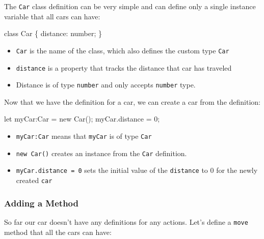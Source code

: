 \documentclass[12pt,]{article}
\newenvironment{Shaded}{}{}
\newcommand{\KeywordTok}[1]{\textcolor[rgb]{0.00,0.00,1.00}{{#1}}}
\newcommand{\DecValTok}[1]{{#1}}
\newcommand{\FunctionTok}[1]{{#1}}
\newcommand{\NormalTok}[1]{{#1}}
\providecommand{\tightlist}{%
  \setlength{\itemsep}{0pt}\setlength{\parskip}{0pt}}
\begin{document}
The \texttt{Car} class definition can be very simple and can define only
a single instance variable that all cars can have:

\begin{Shaded}
\begin{Highlighting}[numbers=left,,]
\KeywordTok{class} \NormalTok{Car \{}
  \NormalTok{distance: number;}
\NormalTok{\}}
\end{Highlighting}
\end{Shaded}

\begin{itemize}
\tightlist
\item
  \texttt{Car} is the name of the class, which also defines the custom
  type \texttt{Car}
\item
  \texttt{distance} is a property that tracks the distance that car has
  traveled
\item
  Distance is of type \texttt{number} and only accepts \texttt{number}
  type.
\end{itemize}

Now that we have the definition for a car, we can create a car from the
definition:

\begin{Shaded}
\begin{Highlighting}[numbers=left,,]
\NormalTok{let myCar:Car = }\KeywordTok{new} \FunctionTok{Car}\NormalTok{();}
\NormalTok{myCar.}\FunctionTok{distance} \NormalTok{= }\DecValTok{0}\NormalTok{;}
\end{Highlighting}
\end{Shaded}

\begin{itemize}
\tightlist
\item
  \texttt{myCar:Car} means that \texttt{myCar} is of type \texttt{Car}
\item
  \texttt{new\ Car()} creates an instance from the \texttt{Car}
  definition.
\item
  \texttt{myCar.distance\ =\ 0} sets the initial value of the
  \texttt{distance} to 0 for the newly created \texttt{car}
\end{itemize}

\subsubsection{Adding a Method}\label{adding-a-method}

So far our car doesn't have any definitions for any actions. Let's
define a \texttt{move} method that all the cars can have:
\end{document}
